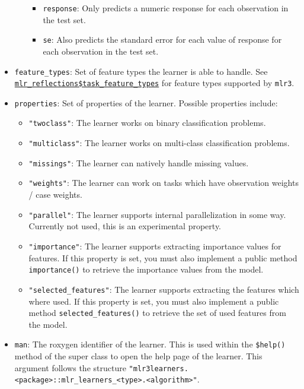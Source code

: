 \documentclass[]{scrbook}
\providecommand{\tightlist}{%
  \setlength{\itemsep}{0pt}\setlength{\parskip}{0pt}}
\begin{document}
\begin{itemize}
\begin{itemize}
    \begin{itemize}
    \tightlist
    \item
      \texttt{response}: Only predicts a numeric response for each observation in the test set.
    \item
      \texttt{se}: Also predicts the standard error for each value of response for each observation in the test set.
    \end{itemize}
  \end{itemize}
\item
  \texttt{feature\_types}: Set of feature types the learner is able to handle.
  See \href{https://mlr3.mlr-org.com/reference/mlr_reflections.html}{\texttt{mlr\_reflections\$task\_feature\_types}} for feature types supported by \texttt{mlr3}.
\item
  \texttt{properties}: Set of properties of the learner. Possible properties include:

  \begin{itemize}
  \tightlist
  \item
    \texttt{"twoclass"}: The learner works on binary classification problems.
  \item
    \texttt{"multiclass"}: The learner works on multi-class classification problems.
  \item
    \texttt{"missings"}: The learner can natively handle missing values.
  \item
    \texttt{"weights"}: The learner can work on tasks which have observation weights / case weights.
  \item
    \texttt{"parallel"}: The learner supports internal parallelization in some way.
    Currently not used, this is an experimental property.
  \item
    \texttt{"importance"}: The learner supports extracting importance values for features.
    If this property is set, you must also implement a public method \texttt{importance()} to retrieve the importance values from the model.
  \item
    \texttt{"selected\_features"}: The learner supports extracting the features which where used.
    If this property is set, you must also implement a public method \texttt{selected\_features()} to retrieve the set of used features from the model.
  \end{itemize}
\item
  \texttt{man}: The roxygen identifier of the learner.
  This is used within the \texttt{\$help()} method of the super class to open the help page of the learner.
  This argument follows the structure \texttt{"mlr3learners.\textless{}package\textgreater{}::mlr\_learners\_\textless{}type\textgreater{}.\textless{}algorithm\textgreater{}"}.
\end{itemize}
\end{document}
